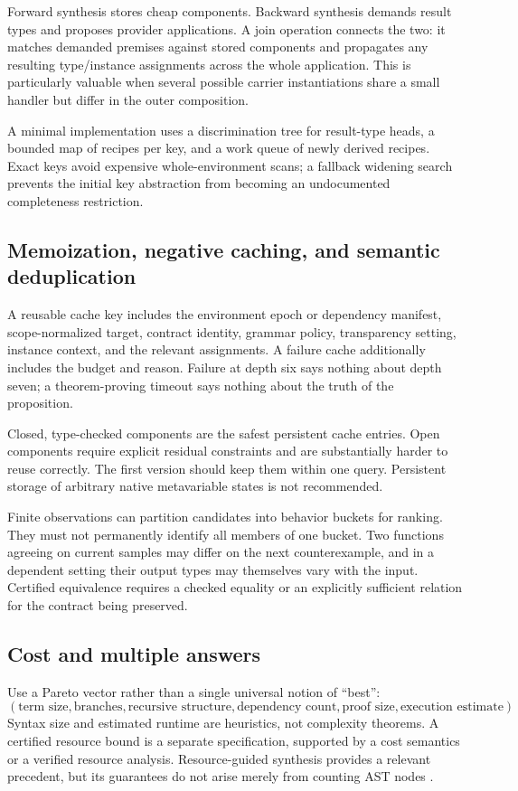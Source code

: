 \documentclass[11pt,a4paper]{article}
\theoremstyle{remark}
\begin{document}
Forward synthesis stores cheap components. Backward synthesis demands result types and proposes provider applications. A join operation connects the two: it matches demanded premises against stored components and propagates any resulting type/instance assignments across the whole application. This is particularly valuable when several possible carrier instantiations share a small handler but differ in the outer composition.

A minimal implementation uses a discrimination tree for result-type heads, a bounded map of recipes per key, and a work queue of newly derived recipes. Exact keys avoid expensive whole-environment scans; a fallback widening search prevents the initial key abstraction from becoming an undocumented completeness restriction.

\subsection{Memoization, negative caching, and semantic deduplication}

A reusable cache key includes the environment epoch or dependency manifest, scope-normalized target, contract identity, grammar policy, transparency setting, instance context, and the relevant assignments. A failure cache additionally includes the budget and reason. Failure at depth six says nothing about depth seven; a theorem-proving timeout says nothing about the truth of the proposition.

Closed, type-checked components are the safest persistent cache entries. Open components require explicit residual constraints and are substantially harder to reuse correctly. The first version should keep them within one query. Persistent storage of arbitrary native metavariable states is not recommended.

Finite observations can partition candidates into behavior buckets for ranking. They must not permanently identify all members of one bucket. Two functions agreeing on current samples may differ on the next counterexample, and in a dependent setting their output types may themselves vary with the input. Certified equivalence requires a checked equality or an explicitly sufficient relation for the contract being preserved.

\subsection{Cost and multiple answers}

Use a Pareto vector rather than a single universal notion of ``best'':
\[
 (\text{term size},\text{branches},\text{recursive structure},
   \text{dependency count},\text{proof size},\text{execution estimate}).
\]
Syntax size and estimated runtime are heuristics, not complexity theorems. A certified resource bound is a separate specification, supported by a cost semantics or a verified resource analysis. Resource-guided synthesis provides a relevant precedent, but its guarantees do not arise merely from counting AST nodes \cite{resource-synthesis}.
\end{document}
